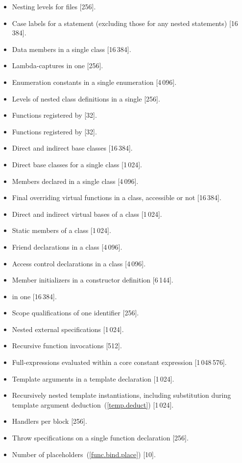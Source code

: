 \begin{itemize}
\item%
Nesting levels for
files [256].
\item%
Case labels for a
statement (excluding those for any nested
statements)
[16\,384].
\item%
Data members in a single class [16\,384].
\item%
Lambda-captures in one  [256].
\item%
Enumeration constants in a single enumeration [4\,096].
\item%
Levels of nested class definitions
in a single
[256].
\item%
Functions registered by
 [32].
\item%
Functions registered by
 [32].
\item%
Direct and indirect base classes [16\,384].
\item%
Direct base classes for a single class [1\,024].
\item%
Members declared in a single class [4\,096].
\item%
Final overriding virtual functions in a class,
accessible or not [16\,384].
\item%
Direct and indirect virtual bases of a class [1\,024].
\item%
Static members of a class [1\,024].
\item%
Friend declarations in a class [4\,096].
\item%
Access control declarations in a class [4\,096].
\item%
Member initializers in a constructor definition [6\,144].
\item%
 in one  [16\,384].
\item%
Scope qualifications of one identifier [256].
\item%
Nested external specifications [1\,024].
\item%
Recursive  function invocations [512].
\item%
Full-expressions evaluated within a core constant expression [1\,048\,576].
\item%
Template arguments in a template declaration [1\,024].
\item%
Recursively nested template instantiations, including substitution
during template argument deduction~(\ref{temp.deduct}) [1\,024].
\item%
Handlers per
block [256].
\item%
Throw specifications on a single function declaration [256].

\item%
Number of placeholders~(\ref{func.bind.place}) [10].

\end{itemize}
